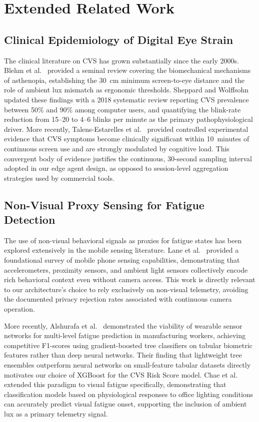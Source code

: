 \documentclass[conference]{IEEEtran}
\begin{document}
\section{Extended Related Work}

\subsection{Clinical Epidemiology of Digital Eye Strain}

The clinical literature on CVS has grown substantially since the early 2000s. Blehm
et al.\ \cite{b3} provided a seminal review covering the biomechanical mechanisms of
asthenopia, establishing the 30~cm minimum screen-to-eye distance and the role of ambient
lux mismatch as ergonomic thresholds. Sheppard and Wolffsohn \cite{b2} updated these
findings with a 2018 systematic review reporting CVS prevalence between 50\% and 90\%
among computer users, and quantifying the blink-rate reduction from 15--20 to 4--6
blinks per minute as the primary pathophysiological driver. More recently, Talens-Estarelles
et al.\ \cite{b18} provided controlled experimental evidence that CVS symptoms become
clinically significant within 10~minutes of continuous screen use and are strongly
modulated by cognitive load. This convergent body of evidence justifies the continuous,
30-second sampling interval adopted in our edge agent design, as opposed to session-level
aggregation strategies used by commercial tools.

\subsection{Non-Visual Proxy Sensing for Fatigue Detection}

The use of non-visual behavioral signals as proxies for fatigue states has been
explored extensively in the mobile sensing literature. Lane et al.\ \cite{b4} provided
a foundational survey of mobile phone sensing capabilities, demonstrating that
accelerometers, proximity sensors, and ambient light sensors collectively encode rich
behavioral context even without camera access. This work is directly relevant to our
architecture's choice to rely exclusively on non-visual telemetry, avoiding the
documented privacy rejection rates associated with continuous camera operation.

More recently, Alshurafa et al.\ \cite{b19} demonstrated the viability of wearable
sensor networks for multi-level fatigue prediction in manufacturing workers, achieving
competitive F1-scores using gradient-boosted tree classifiers on tabular biometric
features rather than deep neural networks. Their finding that lightweight tree ensembles
outperform neural networks on small-feature tabular datasets directly motivates our
choice of XGBoost for the CVS Risk Score model. Chae et al.\ \cite{b22} extended this
paradigm to visual fatigue specifically, demonstrating that classification models based
on physiological responses to office lighting conditions can accurately predict visual
fatigue onset, supporting the inclusion of ambient lux as a primary telemetry signal.
\end{document}
